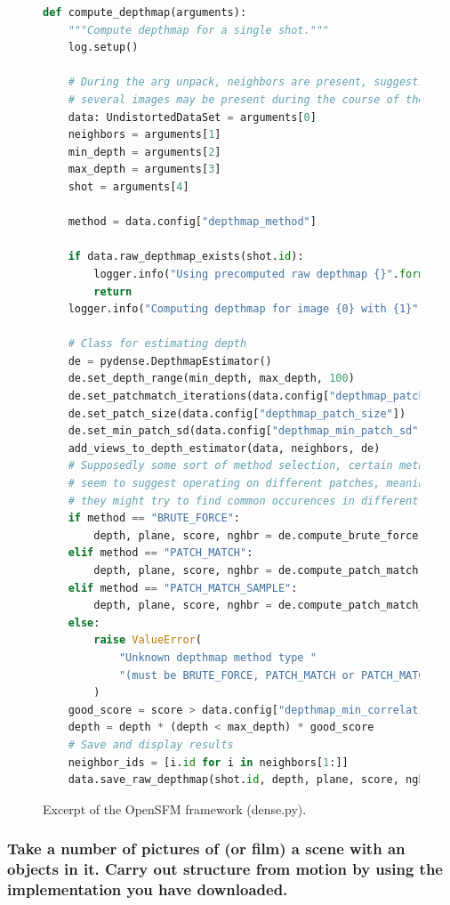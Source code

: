 \documentclass[a4paper, titlepage,12pt]{article}
\begin{document}
	\begin{figure}[H]
		\begin{center}
			\begin{lstlisting}[language=Python]
def compute_depthmap(arguments):
    """Compute depthmap for a single shot."""
    log.setup()

	# During the arg unpack, neighbors are present, suggesting that
	# several images may be present during the course of the algorithm
    data: UndistortedDataSet = arguments[0]
    neighbors = arguments[1]
    min_depth = arguments[2]
    max_depth = arguments[3]
    shot = arguments[4]

    method = data.config["depthmap_method"]

    if data.raw_depthmap_exists(shot.id):
        logger.info("Using precomputed raw depthmap {}".format(shot.id))
        return
    logger.info("Computing depthmap for image {0} with {1}".format(shot.id, method))

	# Class for estimating depth
    de = pydense.DepthmapEstimator()
    de.set_depth_range(min_depth, max_depth, 100)
    de.set_patchmatch_iterations(data.config["depthmap_patchmatch_iterations"])
    de.set_patch_size(data.config["depthmap_patch_size"])
    de.set_min_patch_sd(data.config["depthmap_min_patch_sd"])
    add_views_to_depth_estimator(data, neighbors, de)
	# Supposedly some sort of method selection, certain methods
	# seem to suggest operating on different patches, meaning
	# they might try to find common occurences in different images
    if method == "BRUTE_FORCE":
        depth, plane, score, nghbr = de.compute_brute_force()
    elif method == "PATCH_MATCH":
        depth, plane, score, nghbr = de.compute_patch_match()
    elif method == "PATCH_MATCH_SAMPLE":
        depth, plane, score, nghbr = de.compute_patch_match_sample()
    else:
        raise ValueError(
            "Unknown depthmap method type "
            "(must be BRUTE_FORCE, PATCH_MATCH or PATCH_MATCH_SAMPLE)"
        )
    good_score = score > data.config["depthmap_min_correlation_score"]
    depth = depth * (depth < max_depth) * good_score
    # Save and display results
    neighbor_ids = [i.id for i in neighbors[1:]]
    data.save_raw_depthmap(shot.id, depth, plane, score, nghbr, neighbor_ids)
			\end{lstlisting}
			\caption{Excerpt of the OpenSFM framework (dense.py).}
		\end{center}
	\end{figure}

	\subsubsection*{Take a number of pictures of (or film) a scene with an objects in it. Carry out structure from motion by using the implementation you have downloaded.}
\end{document}
